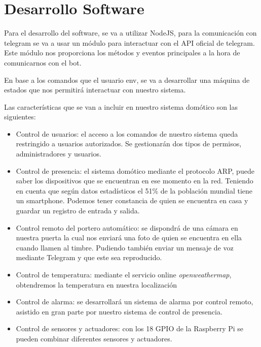 \documentclass[10pt,journal,compsoc]{IEEEtran}
\begin{document}
\section{Desarrollo Software}
Para el desarrollo del software, se va a utilizar NodeJS, para la comunicación con telegram se va a 
usar un módulo para interactuar con el API oficial de telegram. Este módulo nos proporciona los 
métodos y eventos principales a la hora de comunicarnos con el bot.

En base a los comandos que el usuario env, se va a desarrollar una máquina de estados que nos 
permitirá interactuar con nuestro sistema.

Las características que se van a incluir en nuestro sistema domótico son las siguientes:
\begin{itemize}
\item Control de usuarios: el acceso a los comandos de nuestro sistema queda restringido a 
usuarios autorizados. Se gestionarán dos tipos de permisos, administradores y usuarios.
\item Control de presencia: el sistema domótico mediante el protocolo ARP, puede saber los 
dispositivos que se encuentran en ese momento en la red. Teniendo en cuenta que según datos 
estadísticos el 51\% de la población mundial tiene un smartphone. Podemos tener constancia de 
quien se encuentra en casa y guardar un registro de entrada y salida.
\item Control remoto del portero automático: se dispondrá de una cámara en nuestra puerta la cual 
nos enviará una foto de quien se encuentra en ella cuando llamen al timbre. Pudiendo también enviar 
un mensaje de voz mediante Telegram y que este sea reproducido.
\item Control de temperatura: mediante el servicio online \textit{openweathermap}, obtendremos la 
temperatura en nuestra localización
\item Control de alarma: se desarrollará un sistema de alarma por control remoto, asistido en 
gran parte por nuestro sistema de control de presencia.
\item Control de sensores y actuadores: con los 18 GPIO de la Raspberry Pi se pueden combinar 
diferentes sensores y actuadores.
\end{itemize}
\end{document}
